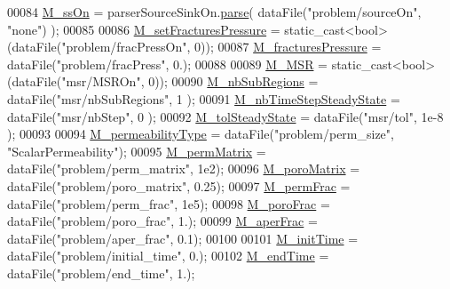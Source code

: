 \begin{DoxyCode}
00084     \hyperlink{classFVCode3D_1_1Data_af778c7ca663600660d71e09b2722ef57}{M\_ssOn} = parserSourceSinkOn.\hyperlink{classFVCode3D_1_1EnumParser_a47ae536aad82ef52509472c0c7f1022e}{parse}( dataFile(\textcolor{stringliteral}{"problem/sourceOn"}, \textcolor{stringliteral}{"none"}) );
00085 
00086     \hyperlink{classFVCode3D_1_1Data_a50bb4aa8e225203af91e6221e6017549}{M\_setFracturesPressure} = \textcolor{keyword}{static\_cast<}\textcolor{keywordtype}{bool}\textcolor{keyword}{>}(dataFile(\textcolor{stringliteral}{"problem/fracPressOn"}, 0));
00087     \hyperlink{classFVCode3D_1_1Data_af04c830d4b03507186fbd36ad0ffcb2c}{M\_fracturesPressure} = dataFile(\textcolor{stringliteral}{"problem/fracPress"}, 0.);
00088 
00089     \hyperlink{classFVCode3D_1_1Data_a79a937025567c594d491124fdd7371d1}{M\_MSR} = \textcolor{keyword}{static\_cast<}\textcolor{keywordtype}{bool}\textcolor{keyword}{>}(dataFile(\textcolor{stringliteral}{"msr/MSROn"}, 0));
00090     \hyperlink{classFVCode3D_1_1Data_a939f25d917c0fc4cc307727f0161818d}{M\_nbSubRegions} = dataFile(\textcolor{stringliteral}{"msr/nbSubRegions"}, 1 );
00091     \hyperlink{classFVCode3D_1_1Data_a89795eb2a12c28f1f919c3148c44556e}{M\_nbTimeStepSteadyState} = dataFile(\textcolor{stringliteral}{"msr/nbStep"}, 0 );
00092     \hyperlink{classFVCode3D_1_1Data_a985779d5af3b0a0cdee095d599f4edc5}{M\_tolSteadyState} = dataFile(\textcolor{stringliteral}{"msr/tol"}, 1e-8 );
00093 
00094     \hyperlink{classFVCode3D_1_1Data_a313a43a63768026ac108106fa90113c9}{M\_permeabilityType} = dataFile(\textcolor{stringliteral}{"problem/perm\_size"}, \textcolor{stringliteral}{"ScalarPermeability"});
00095     \hyperlink{classFVCode3D_1_1Data_aa91f66274ed34a57c63f5c106b371109}{M\_permMatrix} = dataFile(\textcolor{stringliteral}{"problem/perm\_matrix"}, 1e2);
00096     \hyperlink{classFVCode3D_1_1Data_ab4e2bcf1ebf986f6e5329b695707a73e}{M\_poroMatrix} = dataFile(\textcolor{stringliteral}{"problem/poro\_matrix"}, 0.25);
00097     \hyperlink{classFVCode3D_1_1Data_a68f9fa864f076c053ae8ac8a3f86f7ea}{M\_permFrac} = dataFile(\textcolor{stringliteral}{"problem/perm\_frac"}, 1e5);
00098     \hyperlink{classFVCode3D_1_1Data_af95b239d77dd531aaa59e3ac891dbd71}{M\_poroFrac} = dataFile(\textcolor{stringliteral}{"problem/poro\_frac"}, 1.);
00099     \hyperlink{classFVCode3D_1_1Data_abf85bba32b4b3bdc3a392f193d4a145d}{M\_aperFrac} = dataFile(\textcolor{stringliteral}{"problem/aper\_frac"}, 0.1);
00100 
00101     \hyperlink{classFVCode3D_1_1Data_ab4a94e00bef44eb2195783ffa4682cf0}{M\_initTime} = dataFile(\textcolor{stringliteral}{"problem/initial\_time"}, 0.);
00102     \hyperlink{classFVCode3D_1_1Data_ad0db1011dedc7485e6b4393c872506c0}{M\_endTime} = dataFile(\textcolor{stringliteral}{"problem/end\_time"}, 1.);

\end{DoxyCode}
